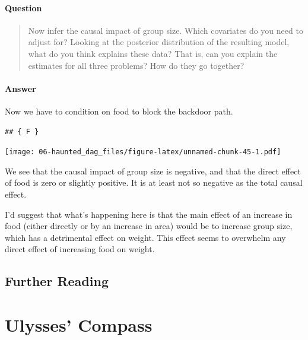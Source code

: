 \documentclass[
]{book}
\begin{document}
\hypertarget{question-59}{%
\subsubsection*{Question}\label{question-59}}

\begin{quote}
Now infer the causal impact of group size. Which covariates do you need to adjust for? Looking at the posterior distribution of the resulting model, what do you think explains these data? That is, can you explain the estimates for all three problems? How do they go together?
\end{quote}

\hypertarget{answer-59}{%
\subsubsection*{Answer}\label{answer-59}}

Now we have to condition on food to block the backdoor path.

\begin{verbatim}
## { F }
\end{verbatim}

\texttt{[image: 06-haunted\_dag\_files/figure-latex/unnamed-chunk-45-1.pdf]}

We see that the causal impact of group size is negative, and that the direct effect of food is zero or slightly positive. It is at least not so negative as the total causal effect.

I'd suggest that what's happening here is that the main effect of an increase in food (either directly or by an increase in area) would be to increase group size, which has a detrimental effect on weight. This effect seems to overwhelm any direct effect of increasing food on weight.

\hypertarget{further-reading-5}{%
\section*{Further Reading}\label{further-reading-5}}

\hypertarget{ulysses}{%
\chapter{Ulysses' Compass}\label{ulysses}}
\end{document}
